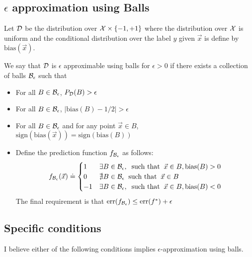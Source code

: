 \documentclass{article}
\newcommand{\err}{\mbox{err}}
\newcommand{\X}{{\cal X}}
\newcommand{\D}{{\cal D}}
\newcommand{\x}{\vec{x}}
\newcommand{\bias}{\text{bias}}
\newcommand{\sign}{\text{sign}}
\begin{document}
\subsection{$\epsilon$ approximation using Balls}

Let $\D$ be the distribution over $\X\times \{-1,+1\}$ where the
distribution over $\X$ is uniform and the conditional distribution
over the label $y$ given $\x$ is define by $\bias(\x)$.

\newcommand{\Be}{{\cal B}_{\epsilon}}
\newcommand{\fBe}{f_{\Be}}
\newcommand{\UBe}{U_{\epsilon}}
We say that $\D$ is $\epsilon$ approximable using balls for $\epsilon>0$ if
there exists a collection of balls $\Be$ such that 
\begin{itemize}
\item For all $B \in \Be$, $P_{\D}(B)>\epsilon$
\item For all $B \in \Be$, $|\bias(B)-1/2| > \epsilon$
\item For all $B \in \Be$ and for any point $\x \in B$, $\sign(\bias(\x))=\sign(\bias(B))$
\item %
  Define the prediction function $\fBe$ as follows:
  \[
  \fBe(\x) \doteq \begin{cases}
    1 & \exists B \in \Be, \;\;\mbox{such that}\;\; \x \in B,
    \bias(B)>0 \\
    0 & \nexists B \in \Be \;\;\mbox{such that}\;\; \x \in B \\
    -1 & \exists B \in \Be, \;\;\mbox{such that}\;\; \x \in B,
    \bias(B)<0
  \end{cases}
  \]
  The final requirement is that $\err(\fBe) \leq \err(\Bayes)+\epsilon$
\end{itemize}

\subsection{Specific conditions}

I believe either of the following conditions implies
$\epsilon$-approximation using balls.
\end{document}
